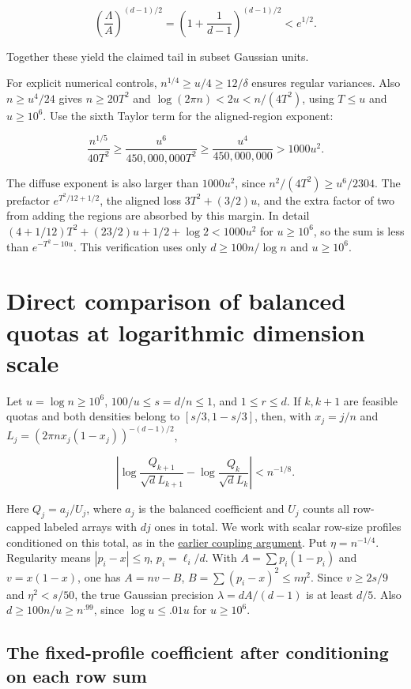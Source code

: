 \documentclass[11pt]{article}
\begin{document}
\[
\left(\frac{\Lambda}{A}\right)^{(d-1)/2}
=\left(1+\frac1{d-1}\right)^{(d-1)/2}<e^{1/2}.
\]

Together these yield the claimed tail in subset Gaussian units.

For explicit numerical controls, $n^{1/4}\ge u/4\ge12/\delta$ ensures
regular variances. Also $n\ge u^4/24$ gives $n\ge20T^2$ and
$\log(2\pi n)<2u<n/(4T^2)$, using $T\le u$ and $u\ge10^6$.
Use the sixth Taylor term for the aligned-region exponent:

\[
\frac{n^{1/5}}{40T^2}
\ge\frac{u^6}{450{,}000{,}000T^2}
\ge\frac{u^4}{450{,}000{,}000}>1000u^2.
\]

The diffuse exponent is also larger than $1000u^2$, since
$n^2/(4T^2)\ge u^6/2304$. The prefactor $e^{T^2/12+1/2}$,
the aligned loss $3T^2+(3/2)u$, and the extra factor of two from
adding the regions are absorbed by this margin. In detail
$(4+1/12)T^2+(23/2)u+1/2+\log2<1000u^2$ for $u\ge10^6$,
so the sum is less than $e^{-T^2-10u}$. This verification uses
only $d\ge100n/\log n$ and $u\ge10^6$.

\section{Direct comparison of balanced quotas at logarithmic dimension scale}

Let $u=\log n\ge10^6$, $100/u\le s=d/n\le1$, and $1\le r\le d$. If $k,k+1$ are feasible quotas and both densities belong to $[s/3,1-s/3]$, then, with $x_j=j/n$ and $L_j=(2\pi n x_j(1-x_j))^{-(d-1)/2}$,

\[
\left|\log\frac{Q_{k+1}}{\sqrt d L_{k+1}}-\log\frac{Q_k}{\sqrt d L_k}\right|<n^{-1/8}.
\]

Here $Q_j=a_j/U_j$, where $a_j$ is the balanced coefficient and $U_j$ counts all row-capped labeled arrays with $dj$ ones in total. We work with scalar row-size profiles conditioned on this total, as in the \href{https://github.com/ProgramComputer/open-math-research/blob/main/topics/balanced-arrays/adjacent-quotas/comparison.md}{earlier coupling argument}. Put $\eta=n^{-1/4}$. Regularity means $|p_i-x|\le\eta$, $p_i=\ell_i/d$. With $A=\sum p_i(1-p_i)$ and $v=x(1-x)$, one has $A=nv-B$, $B=\sum(p_i-x)^2\le n\eta^2$. Since $v\ge2s/9$ and $\eta^2<s/50$, the true Gaussian precision $\lambda=dA/(d-1)$ is at least $d/5$. Also $d\ge100n/u\ge n^{.99}$, since $\log u\le .01u$ for $u\ge10^6$.

\subsection{The fixed-profile coefficient after conditioning on each row sum}
\end{document}
